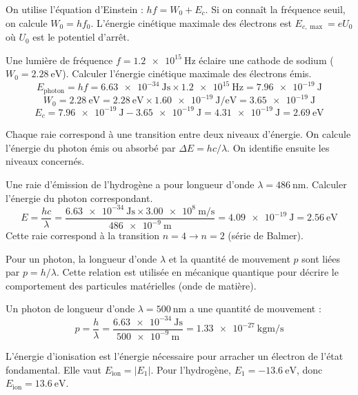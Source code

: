 On utilise l'équation d'Einstein : \(h f = W_0 + E_c\). Si on connaît la fréquence seuil, on calcule \(W_0 = h f_0\). L'énergie cinétique maximale des électrons est \(E_{c,\max} = e U_0\) où \(U_0\) est le potentiel d'arrêt.

\begin{exemple}
Une lumière de fréquence \(f = \SI{1.2e15}{\hertz}\) éclaire une cathode de sodium (\(W_0 = \SI{2.28}{\electronvolt}\)). Calculer l'énergie cinétique maximale des électrons émis.
\[
E_{\text{photon}} = h f = \SI{6.63e-34}{\joule\second} \times \SI{1.2e15}{\hertz} = \SI{7.96e-19}{\joule}
\]
\[
W_0 = \SI{2.28}{\electronvolt} = \SI{2.28}{\electronvolt} \times \SI{1.60e-19}{\joule\per\electronvolt} = \SI{3.65e-19}{\joule}
\]
\[
E_c = \SI{7.96e-19}{\joule} - \SI{3.65e-19}{\joule} = \SI{4.31e-19}{\joule} = \SI{2.69}{\electronvolt}
\]
\end{exemple}

Chaque raie correspond à une transition entre deux niveaux d'énergie. On calcule l'énergie du photon émis ou absorbé par \(\Delta E = h c / \lambda\). On identifie ensuite les niveaux concernés.

\begin{exemple}
Une raie d'émission de l'hydrogène a pour longueur d'onde \(\lambda = \SI{486}{\nano\metre}\). Calculer l'énergie du photon correspondant.
\[
E = \frac{h c}{\lambda} = \frac{\SI{6.63e-34}{\joule\second} \times \SI{3.00e8}{\metre\per\second}}{\SI{486e-9}{\metre}} = \SI{4.09e-19}{\joule} = \SI{2.56}{\electronvolt}
\]
Cette raie correspond à la transition \(n=4 \to n=2\) (série de Balmer).
\end{exemple}

Pour un photon, la longueur d'onde \(\lambda\) et la quantité de mouvement \(p\) sont liées par \(p = h / \lambda\). Cette relation est utilisée en mécanique quantique pour décrire le comportement des particules matérielles (onde de matière).

\begin{exemple}
Un photon de longueur d'onde \(\lambda = \SI{500}{\nano\metre}\) a une quantité de mouvement :
\[
p = \frac{h}{\lambda} = \frac{\SI{6.63e-34}{\joule\second}}{\SI{500e-9}{\metre}} = \SI{1.33e-27}{\kilogram\metre\per\second}
\]
\end{exemple}

L'énergie d'ionisation est l'énergie nécessaire pour arracher un électron de l'état fondamental. Elle vaut \(E_{\text{ion}} = |E_1|\). Pour l'hydrogène, \(E_1 = \SI{-13.6}{\electronvolt}\), donc \(E_{\text{ion}} = \SI{13.6}{\electronvolt}\).

